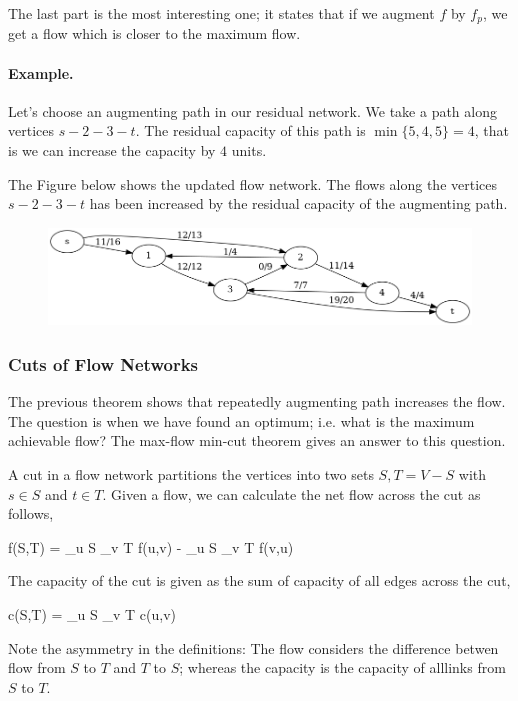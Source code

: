 The last part is the most interesting one; it states that if we augment $f$ by $f_p$, we get a flow which is closer to the maximum flow.

\paragraph{Example.} Let's choose an augmenting path in our residual network. We take a path along vertices $s - 2 - 3 - t$. The residual capacity of this path is $\min\{5, 4, 5\} = 4$, that is we can increase the capacity by $4$ units. 

The Figure below shows the updated flow network. The flows along the vertices $s - 2 - 3 - t$ has been increased by the residual capacity of the augmenting path.

\begin{figure}[H]
\centering
\includegraphics[scale=0.45]{images/max_flow_04.png}
\end{figure}



\subsubsection{Cuts of Flow Networks}

The previous theorem shows that repeatedly augmenting path increases the flow. The question is when we have found an optimum; i.e. what is the maximum achievable flow? The max-flow min-cut theorem gives an answer to this question.

A cut in a flow network partitions the vertices into two sets $S, T = V - S$ with $s \in S$ and $t \in T$. Given a flow, we can calculate the net flow across the cut as follows,

\bee
f(S,T) = \sum_{u \in S} \sum_{v \in T} f(u,v) - \sum_{u \in S} \sum_{v \in T} f(v,u)
\eee

The capacity of the cut is given as the sum of capacity of all edges across the cut,

\bee
c(S,T) = \sum_{u \in S} \sum_{v \in T} c(u,v)
\eee

Note the asymmetry in the definitions: The flow considers the difference betwen flow from $S$ to $T$ and $T$ to $S$; whereas the capacity is the capacity of alllinks from $S$ to $T$.

